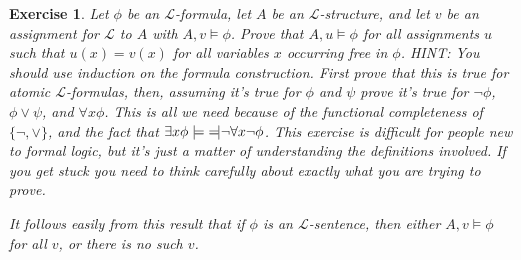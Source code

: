 \documentclass{article}
\theoremstyle{plain}
\newtheorem{Q}[theorem]{Exercise}{\bfseries}{\upshape}
\newcommand{\sL}{\mathscr{L}}
\newcommand{\lequiv}{\models\text{\reflectbox{$\models$}}}
\begin{document}
\begin{Q}\label{\prefix Q:assign}
Let $\phi$ be an $\sL$-formula, let $A$ be an $\sL$-structure, and let $v$ be an assignment for $\sL$ to $A$ with $A,v \models \phi$. Prove that $A,u\models \phi$ for all assignments $u$ such that $u(x)= v(x)$ for all variables $x$ occurring free in $\phi$. HINT: You should use induction on the formula construction. First prove that this is true for atomic $\sL$-formulas, then, assuming it's true for $\phi$ and $\psi$ prove it's true for $\neg\phi$, $\phi\vee \psi$, and $\forall x \phi$. This is all we need because of the functional completeness of $\{\neg,\vee\}$, and the fact that $\exists x \phi \lequiv \neg \forall x\neg \phi$. This exercise is difficult for people new to formal logic, but it's just a matter of understanding the definitions involved. If you get stuck you need to think carefully about exactly what you are trying to prove. 

It follows easily from this result that if $\phi$ is an $\sL$-sentence, then either $A, v\models \phi$ for all $v$, or there is no such $v$.
\end{Q}
\end{document}
